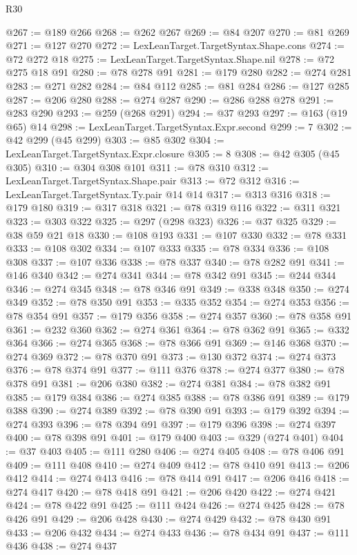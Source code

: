 \begin{lexlean}{R30}
\begin{coremodule}
@267 := @189 @266
@268 := @262 @267
@269 := @84 @207
@270 := @81 @269
@271 := @127 @270
@272 := LexLeanTarget.TargetSyntax.Shape.cons
@274 := @72 @272 @18
@275 := LexLeanTarget.TargetSyntax.Shape.nil
@278 := @72 @275 @18 @91
@280 := @78 @278 @91
@281 := @179 @280
@282 := @274 @281
@283 := @271 @282
@284 := @84 @112
@285 := @81 @284
@286 := @127 @285
@287 := @206 @280
@288 := @274 @287
@290 := @286 @288 @278
@291 := @283 @290
@293 := @259 (@268 @291)
@294 := @37 @293
@297 := @163 (@19 @65) @14
@298 := LexLeanTarget.TargetSyntax.Expr.second
@299 := 7
@302 := @42 @299 (@45 @299)
@303 := @85 @302
@304 := LexLeanTarget.TargetSyntax.Expr.closure
@305 := 8
@308 := @42 @305 (@45 @305)
@310 := @304 @308 @101
@311 := @78 @310
@312 := LexLeanTarget.TargetSyntax.Shape.pair
@313 := @72 @312
@316 := LexLeanTarget.TargetSyntax.Ty.pair @14 @14
@317 := @313 @316
@318 := @179 @180
@319 := @317 @318
@321 := @78 @319 @116
@322 := @311 @321
@323 := @303 @322
@325 := @297 (@298 @323)
@326 := @37 @325
@329 := @38 @59 @21 @18
@330 := @108 @193
@331 := @107 @330
@332 := @78 @331
@333 := @108 @302
@334 := @107 @333
@335 := @78 @334
@336 := @108 @308
@337 := @107 @336
@338 := @78 @337
@340 := @78 @282 @91
@341 := @146 @340
@342 := @274 @341
@344 := @78 @342 @91
@345 := @244 @344
@346 := @274 @345
@348 := @78 @346 @91
@349 := @338 @348
@350 := @274 @349
@352 := @78 @350 @91
@353 := @335 @352
@354 := @274 @353
@356 := @78 @354 @91
@357 := @179 @356
@358 := @274 @357
@360 := @78 @358 @91
@361 := @232 @360
@362 := @274 @361
@364 := @78 @362 @91
@365 := @332 @364
@366 := @274 @365
@368 := @78 @366 @91
@369 := @146 @368
@370 := @274 @369
@372 := @78 @370 @91
@373 := @130 @372
@374 := @274 @373
@376 := @78 @374 @91
@377 := @111 @376
@378 := @274 @377
@380 := @78 @378 @91
@381 := @206 @380
@382 := @274 @381
@384 := @78 @382 @91
@385 := @179 @384
@386 := @274 @385
@388 := @78 @386 @91
@389 := @179 @388
@390 := @274 @389
@392 := @78 @390 @91
@393 := @179 @392
@394 := @274 @393
@396 := @78 @394 @91
@397 := @179 @396
@398 := @274 @397
@400 := @78 @398 @91
@401 := @179 @400
@403 := @329 (@274 @401)
@404 := @37 @403
@405 := @111 @280
@406 := @274 @405
@408 := @78 @406 @91
@409 := @111 @408
@410 := @274 @409
@412 := @78 @410 @91
@413 := @206 @412
@414 := @274 @413
@416 := @78 @414 @91
@417 := @206 @416
@418 := @274 @417
@420 := @78 @418 @91
@421 := @206 @420
@422 := @274 @421
@424 := @78 @422 @91
@425 := @111 @424
@426 := @274 @425
@428 := @78 @426 @91
@429 := @206 @428
@430 := @274 @429
@432 := @78 @430 @91
@433 := @206 @432
@434 := @274 @433
@436 := @78 @434 @91
@437 := @111 @436
@438 := @274 @437

\end{coremodule}
\end{lexlean}
